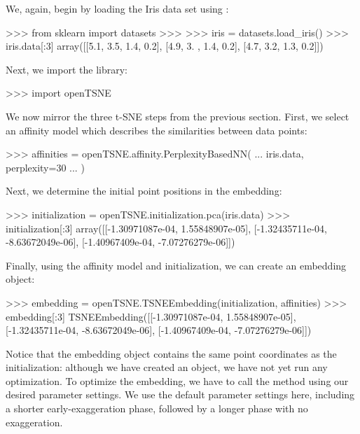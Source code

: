 \documentclass[article]{jss}
\newcommand{\opentsne}{\pkg{openTSNE}\xspace}
\begin{document}
We, again, begin by loading the Iris data set using :
\begin{CodeChunk}
\begin{CodeInput}
>>> from sklearn import datasets
>>>
>>> iris = datasets.load_iris()
>>> iris.data[:3]
array([[5.1, 3.5, 1.4, 0.2],
       [4.9, 3. , 1.4, 0.2],
       [4.7, 3.2, 1.3, 0.2]])
\end{CodeInput}
\end{CodeChunk}
Next, we import the \opentsne library:
\begin{CodeChunk}
\begin{CodeInput}
>>> import openTSNE
\end{CodeInput}
\end{CodeChunk}
We now mirror the three t-SNE steps from the previous section. First, we select an affinity model which describes the similarities between data points:
\begin{CodeChunk}
\begin{CodeInput}
>>> affinities = openTSNE.affinity.PerplexityBasedNN(
...     iris.data, perplexity=30
... )
\end{CodeInput}
\end{CodeChunk}
Next, we determine the initial point positions in the embedding:
\begin{CodeChunk}
\begin{CodeInput}
>>> initialization = openTSNE.initialization.pca(iris.data)
>>> initialization[:3]
array([[-1.30971087e-04,  1.55848907e-05],
       [-1.32435711e-04, -8.63672049e-06],
       [-1.40967409e-04, -7.07276279e-06]])
\end{CodeInput}
\end{CodeChunk}
Finally, using the affinity model and initialization, we can create an embedding object:
\begin{CodeChunk}
\begin{CodeInput}
>>> embedding = openTSNE.TSNEEmbedding(initialization, affinities)
>>> embedding[:3]
TSNEEmbedding([[-1.30971087e-04,  1.55848907e-05],
               [-1.32435711e-04, -8.63672049e-06],
               [-1.40967409e-04, -7.07276279e-06]])
\end{CodeInput}
\end{CodeChunk}
Notice that the embedding object contains the same point coordinates as the initialization: although we have created an  object, we have not yet run any optimization. To optimize the embedding, we have to call the  method using our desired parameter settings. We use the default parameter settings here, including a shorter early-exaggeration phase, followed by a longer phase with no exaggeration.
\end{document}
